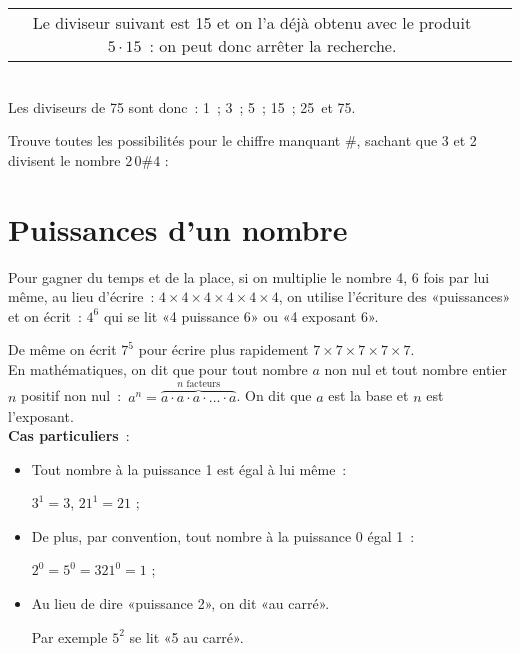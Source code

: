 \begin{methode*1}
\begin{exemple*1}
\begin{tabularx}{\textwidth}{c|X}
Le diviseur suivant est 15 et on l'a déjà obtenu avec le produit $5 \cdot 15$ : on peut donc arrêter la recherche. \\
\end{tabularx} \\[1em]
Les diviseurs de 75 sont donc : \textcolor{J1}{1} ; \textcolor{J1}{3} ; \textcolor{J1}{5} ; \textcolor{A1}{15} ; \textcolor{A1}{25} et \textcolor{A1}{75}.
 \end{exemple*1}



\exercice  
Trouve toutes les possibilités pour le chiffre manquant $\#$, sachant que 3 et 2 divisent le nombre $2\,0\#4$ :



 

 \end{methode*1}
 
 

\section{Puissances d'un nombre}

\begin{aconnaitre}
Pour gagner du temps et de la place, si on multiplie le nombre 4, 6 fois par lui même, au lieu d'écrire : $4 \times 4 \times 4 \times 4 \times 4 \times 4$, on utilise l'écriture des «puissances» et on écrit : $4^6$ qui se lit «4 puissance 6» ou «4 exposant 6».

De même on écrit $7^5$ pour écrire plus rapidement $7 \times 7 \times 7 \times 7 \times 7$. \\[1em]
En mathématiques, on dit que pour tout nombre $a$ non nul et tout nombre entier $n$ positif non nul : $a^n = \stackrel{n \text{ facteurs}}{\overbrace{a \cdot a \cdot a \cdot \ldots \cdot a}}$. On dit que $a$ est la base et $n$ est l'exposant. \\[1em]
\textbf{Cas particuliers} : 
\begin{itemize}
 \item Tout nombre à la puissance 1 est égal à lui même : 
 
 $3^1 = 3$, $21^1 = 21$ ;
 \item De plus, par convention, tout nombre à la puissance 0 égal 1 : 
 
 $2^0 = 5^0 = 321^0 = 1$ ;
 \item Au lieu de dire «puissance 2», on dit «au carré». 
 
 Par exemple $5^2$ se lit «5 au carré».
 \end{itemize}
\end{aconnaitre}

